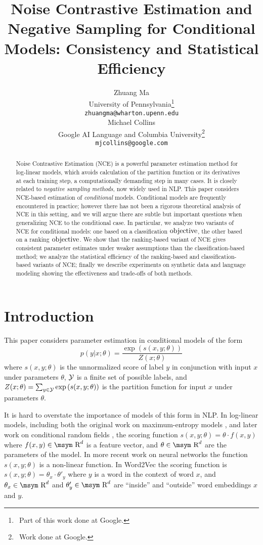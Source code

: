 \documentclass[11pt,a4paper]{article}
\title{Noise Contrastive Estimation and Negative Sampling
for Conditional Models: Consistency and Statistical Efficiency}
\author{Zhuang Ma \\
  University of Pennsylvania\thanks{$\;\,$Part of this work done at Google.}\\
  {\tt zhuangma@wharton.upenn.edu} \\\And
  Michael Collins \\
  Google AI Language and Columbia University\thanks{$\;\,$Work done at Google.} \\
  {\tt mjcollins@google.com} \\}
\date{}
\newcommand{\reals}{\mbox{\msym R}}
\newcommand{\loss}{\hbox{objective}}
\begin{document}
\maketitle
\begin{abstract}
Noise Contrastive Estimation (NCE) is a powerful parameter estimation
method for log-linear models, which avoids calculation of the
partition function or its derivatives at each training step, a
computationally demanding step in many cases. It is closely related
to {\em negative sampling methods}, now widely used in NLP.
This paper considers
NCE-based estimation of {\em conditional} models. Conditional models
are frequently encountered in practice; however there has not been a
rigorous theoretical analysis of NCE in this setting, and we will
argue there are subtle but important questions when generalizing NCE
to the conditional case. In particular, we analyze two variants of NCE
for conditional models: one based on a classification $\loss$, the other
based on a ranking $\loss$. We show that the ranking-based variant of NCE
gives consistent parameter estimates under weaker assumptions than the
classification-based method; we analyze the statistical efficiency of
the ranking-based and classification-based variants of NCE; finally we
describe experiments on synthetic data and language modeling showing the effectiveness
and trade-offs of both methods.
\end{abstract}

\newcommand{\sss}{s}


\section{Introduction}
This paper considers parameter estimation in conditional models of
the form
\begin{equation}
 p(y | x; \theta) = \frac{\exp \left ( \sss(x, y; \theta) \right )}{Z(x; \theta)}
\label{eq:first}
\end{equation}
where $\sss(x, y; \theta)$ is the unnormalized score of label $y$ in
conjunction with input $x$ under parameters $\theta$, ${\cal Y}$ is
a finite set of possible labels, and $Z(x; \theta) = \sum_{y \in
  {\cal Y}} \exp \left ( \sss(x, y; \theta) \right )$ is the partition
function for input $x$ under parameters $\theta$.

It is hard to overstate the importance of models of this form in NLP.
In log-linear models, including both the original work on
maximum-entropy models \cite{maxent}, and later work on conditional
random fields \cite{crfs}, the scoring function $\sss(x, y; \theta) =
\theta \cdot f(x, y)$ where $f(x, y) \in \reals^d$ is a feature
vector, and $\theta \in \reals^d$ are the parameters of the model.  In
more recent work on neural networks the function $\sss(x, y; \theta)$
is a non-linear function. In Word2Vec the
scoring function is
$
\sss(x, y; \theta) = \theta_x \cdot \theta'_y
$
where $y$ is a word in the context of word $x$, and $\theta_x \in \reals^d$
and $\theta'_y \in \reals^d$ are ``inside'' and ``outside'' word embeddings 
$x$ and $y$.
\end{document}
